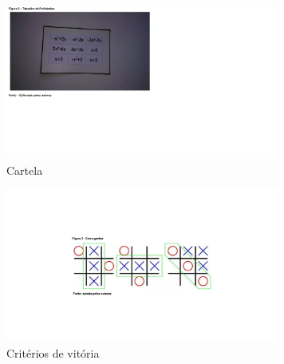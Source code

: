 \documentclass[english,ngerman,parskip=half]{scrartcl}
\begin{document}
\begin{itemize}
        \begin{figure}[ht!]
            \centering
            \includegraphics[width=90mm]{./images/cartela.png}
            \caption{Cartela\label{Cartela}}
        \end{figure}

        \begin{figure}[ht!]
            \centering
            \includegraphics[width=90mm]{./images/crit-vit.png}
            \caption{Critérios de vitória\label{Critérios de vitória}}
        \end{figure}

\end{itemize}
\newpage
\end{document}
